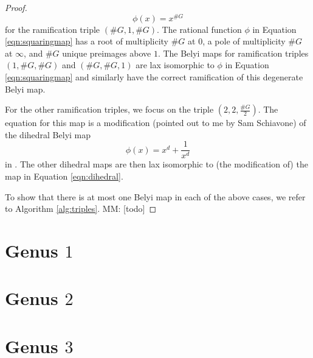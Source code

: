 \documentclass{dcthesis}
\newcommand{\mm}[1]{{\color{blue} \sf MM: [#1]}}
\theoremstyle{definition}
\theoremstyle{remark}
\numberwithin{equation}{section}
\numberwithin{figure}{section}
\begin{document}
{{\begin{proof}
      \begin{equation}\label{eqn:squaringmap}
        \phi(x) = x^{\#G}
      \end{equation}
      for the ramification triple
      $(\#G, 1, \#G)$.
      The rational function $\phi$ in Equation \ref{eqn:squaringmap}
      has a root of multiplicity $\#G$ at $0$,
      a pole of multiplicity $\#G$ at $\infty$,
      and $\#G$ unique preimages above $1$.
      The Belyi maps for ramification triples
      $(1,\#G, \#G)$ and $(\#G, \#G, 1)$
      are lax isomorphic to $\phi$ in Equation \ref{eqn:squaringmap}
      and similarly have the correct ramification of this
      degenerate Belyi map.
      \par
      For the other ramification triples, we focus on
      the triple $(2,2,\frac{\#G}{2})$.
      The equation for this map is a modification
      (pointed out to me by Sam Schiavone)
      of the dihedral Belyi map
      \begin{equation}\label{eqn:dihedral}
        \phi(x) = x^d+\frac{1}{x^d}
      \end{equation}
      in \cite[Example 5.1.2]{turkishbelyithesis}.
      The other dihedral maps are then lax isomorphic to
      (the modification of) the map in Equation \ref{eqn:dihedral}.
      \par
      To show that there is at most one Belyi map in each of the above cases,
      we refer to Algorithm \ref{alg:triples}.
      \mm{todo}
    \end{proof}
  }
  \section{Genus $1$}{\label{sec:genusone}
  }
  \section{Genus $2$}{\label{sec:genustwo}
  }
  \section{Genus $3$}{\label{sec:genusthree}
  }
}
\end{document}
